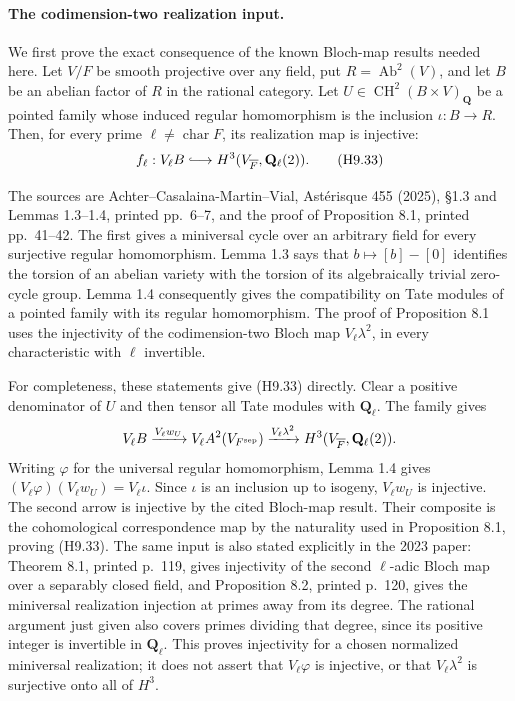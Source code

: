 \paragraph{The codimension-two realization input.}
We first prove the exact consequence of the known Bloch-map results
needed here. Let $V/F$ be smooth projective over any field, put
$R=\operatorname{Ab}^2(V)$, and let $B$ be an abelian factor of $R$ in
the rational category. Let $U\in\operatorname{CH}^2(B\times V)_{\mathbf Q}$
be a pointed family whose induced regular homomorphism is the inclusion
$\iota:B\to R$. Then, for every prime $\ell\ne\operatorname{char}F$,
its realization map is injective:
\[
 f_\ell:V_\ell B\lhook\joinrel\longrightarrow
                   H^3(V_{\overline F},\mathbf Q_\ell(2)).  \tag{H9.33}
\]

The sources are Achter--Casalaina-Martin--Vial, Ast\'erisque 455 (2025),
\S1.3 and Lemmas 1.3--1.4, printed pp.~6--7, and the proof of
Proposition 8.1, printed pp.~41--42. The first gives a miniversal cycle
over an arbitrary field for every surjective regular homomorphism.
Lemma 1.3 says that $b\mapsto[b]-[0]$ identifies the torsion of an
abelian variety with the torsion of its algebraically trivial zero-cycle
group. Lemma 1.4 consequently gives the compatibility on Tate modules
of a pointed family with its regular homomorphism. The proof of
Proposition 8.1 uses the injectivity of the codimension-two Bloch map
$V_\ell\lambda^2$, in every characteristic with $\ell$ invertible.

For completeness, these statements give (H9.33) directly. Clear a
positive denominator of $U$ and then tensor all Tate modules with
$\mathbf Q_\ell$. The family gives
\[
 V_\ell B\xrightarrow{V_\ell w_U}
 V_\ell A^2(V_{F^{\rm sep}})
 \xrightarrow{V_\ell\lambda^2}
 H^3(V_{\overline F},\mathbf Q_\ell(2)).
\]
Writing $\varphi$ for the universal regular homomorphism,
Lemma 1.4 gives
$(V_\ell\varphi)(V_\ell w_U)=V_\ell\iota$.
Since $\iota$ is an inclusion up to isogeny, $V_\ell w_U$ is
injective. The second arrow is injective by the cited Bloch-map
result. Their composite is the cohomological correspondence map
by the naturality used in Proposition 8.1, proving (H9.33).
The same input is also stated explicitly in the 2023 paper:
Theorem 8.1, printed p.~119, gives injectivity of the second
$\ell$-adic Bloch map over a separably closed field, and Proposition
8.2, printed p.~120, gives the miniversal realization injection at
primes away from its degree. The rational argument just given also
covers primes dividing that degree, since its positive integer is
invertible in $\mathbf Q_\ell$.
This proves injectivity for a chosen normalized miniversal realization;
it does not assert that $V_\ell\varphi$ is injective, or that
$V_\ell\lambda^2$ is surjective onto all of $H^3$.

